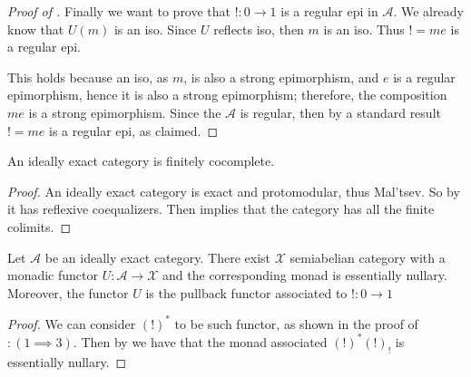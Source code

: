 \begin{subbox}{}
\begin{proof}[\textit{Proof of }]
    Finally we want to prove that $!:0 \to 1$ is a regular epi in $\mathcal{A}$. We already know that $U(m)$ is an iso. Since $U$ reflects iso, then $m$ is an iso. Thus $! = me$ is a regular epi.
    
    This holds because an iso, as $m$, is also a strong epimorphism, and $e$ is a regular epimorphism, hence it is also a strong epimorphism; therefore, the composition $me$ is a strong epimorphism. Since the $\mathcal{A}$ is regular, then by a standard result $!=me$ is a regular epi, as claimed.
    
\end{proof}
\end{subbox}

\begin{mainbox}{}
\begin{prop}
    An ideally exact category is finitely cocomplete.
\end{prop}
\end{mainbox}

\begin{subbox}{}
    \begin{proof}
        An ideally exact category is exact and protomodular, thus Mal'tsev. So by  it has reflexive coequalizers. Then  implies that the category has all the finite colimits.
    \end{proof}
\end{subbox}

\begin{mainbox}{}
\begin{prop}\label{ideally exact has essentially nullary monad}
    Let $\mathcal{A}$ be an ideally exact category.
    There exist $\mathcal{X}$ semiabelian category with a monadic functor $U: \mathcal{A} \to \mathcal{X}$ and the corresponding monad is essentially nullary. Moreover, the functor $U$ is the pullback functor associated to $!: 0 \to 1$
\end{prop}
\end{mainbox}

\begin{subbox}{}
    \begin{proof}
        We can consider $(!)^*$ to be such functor, as shown in the proof of $\mathit{:(1\implies 3)}$. Then by  we have that the monad associated $(!)^*(!)_!$ is essentially nullary.
    \end{proof}
\end{subbox}

